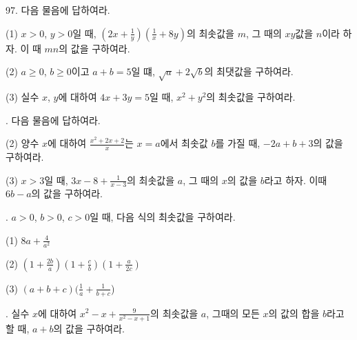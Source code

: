\documentclass{article}
\begin{document}
97.
다음 물음에 답하여라.

\quad\:
(1) \(x>0\), \(y>0\)일 때, \((2x+\frac1y)(\frac1x+8y)\)의 최솟값을 \(m\), 그 때의 \(xy\)값을 \(n\)이라 하자.
이 때 \(mn\)의 값을 구하여라.

\quad\:
(2) \(a\ge0\), \(b\ge0\)이고 \(a+b=5\)일 떄, \(\sqrt a+2\sqrt b\)의 최댓값을 구하여라.

\quad\:
(3) 실수 \(x\), \(y\)에 대하여 \(4x+3y=5\)일 때, \(x^2+y^2\)의 최솟값을 구하여라.

.
다음 물음에 답하여라.

\quad\:
(2) 양수 \(x\)에 대하여 \(\frac{x^2+2x+2}{x}\)는 \(x=a\)에서 최솟값 \(b\)를 가질 때, \(-2a+b+3\)의 값을 구하여라.

\quad\:
(3) \(x>3\)일 때, \(3x-8+\frac1{x-3}\)의 최솟값을 \(a\), 그 때의 \(x\)의 값을 \(b\)라고 하자.
이때 \(6b-a\)의 값을 구하여라.

.
\(a>0\), \(b>0\), \(c>0\)일 때, 다음 식의 최솟값을 구하여라.

\quad\:
(1) \(8a+\frac4{a^2}\)

\quad\:
(2) \((1+\frac{2b}a)(1+\frac cb)(1+\frac a{2c})\)

\quad\:
(3) \((a+b+c)(\frac1a+\frac1{b+c}\))

.
실수 \(x\)에 대하여 \(x^2-x+\frac9{x^2-x+1}\)의 최솟값을 \(a\), 그때의 모든 \(x\)의 값의 합을 \(b\)라고 할 때, \(a+b\)의 값을 구하여라.
\end{document}
